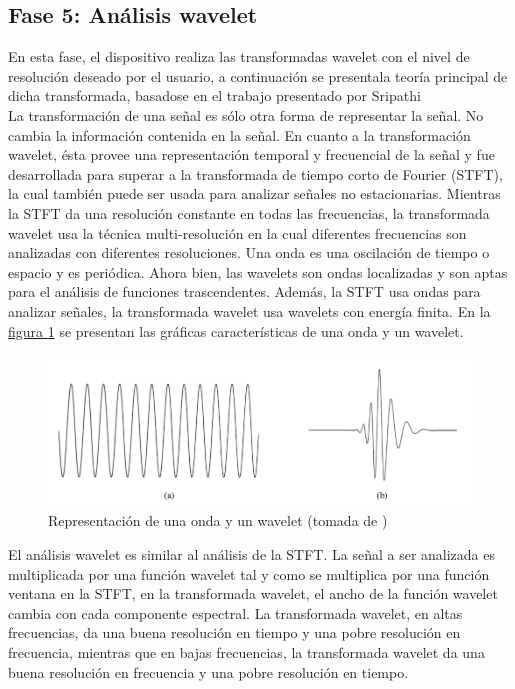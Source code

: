 \documentclass[11pt,lettersize]{article} %
\newcommand{\figura}[1]{\hyperref[{#1}]{figura \ref*{#1}}}
\begin{document}


\subsection{Fase 5: Análisis wavelet}

En esta fase, el dispositivo realiza las transformadas wavelet con el nivel de resolución deseado por el usuario, a continuación se presentala teoría principal de dicha transformada, basadose en el trabajo presentado por Sripathi \cite{Sripathi2003}\\

La transformación de una señal es sólo otra forma de representar la señal. No cambia la información contenida en la señal. En cuanto a la transformación wavelet, ésta provee una representación temporal y frecuencial de la señal y fue desarrollada para superar a la transformada de tiempo corto de Fourier (STFT), la cual también puede ser usada para analizar señales no estacionarias. Mientras la STFT da una resolución constante en todas las frecuencias, la transformada wavelet usa la técnica multi-resolución en la cual diferentes frecuencias son analizadas con diferentes resoluciones. Una onda es una oscilación de tiempo o espacio y es periódica. Ahora bien, las wavelets son ondas localizadas y son aptas para el análisis de funciones trascendentes. Además, la STFT usa ondas para analizar señales, la transformada wavelet usa wavelets con energía finita. En la \figura{F-onda-wavelet} se presentan las gráficas características de una onda y un wavelet. \cite{Burrus1997}
\begin{figure}[h!]
	\centering
	\includegraphics[width=.8\textwidth]{images/onda-wavelet.png}
	\caption[Representación de una onda y un wavelet]{Representación de una onda y un wavelet (tomada de \cite{Burrus1997})}
	\label{F-onda-wavelet}
\end{figure}

El análisis wavelet es similar al análisis de la STFT. La señal a ser analizada es multiplicada por una función wavelet tal y como se multiplica por una función ventana en la STFT, en la transformada wavelet, el ancho de la función wavelet cambia con cada componente espectral. La transformada wavelet, en altas frecuencias, da una buena resolución en tiempo y una pobre resolución en frecuencia, mientras que en bajas frecuencias, la transformada wavelet da una buena resolución en frecuencia y una pobre resolución en tiempo.\\
\end{document}
